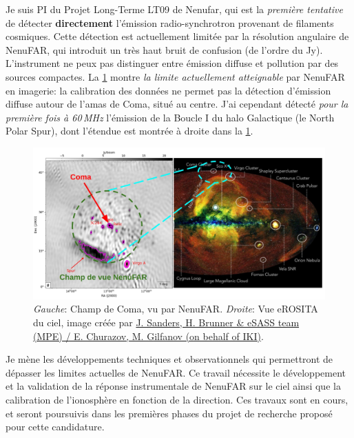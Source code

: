 \pg
Je suis PI du Projet Long-Terme LT09 de Nenufar, qui est la \textit{premi\`ere tentative} de d\'etecter \textbf{directement} l'\'emission radio-synchrotron provenant de filaments cosmiques. Cette d\'etection est actuellement limit\'ee par la r\'esolution angulaire de NenuFAR, qui introduit un tr\`es haut bruit de confusion (de l'ordre du Jy). L'instrument ne peux pas distinguer entre \'emission diffuse et pollution par des sources compactes. La \cref{fig.coma.nenufar} montre \textit{la limite actuellement atteignable} par NenuFAR en imagerie: la calibration des donn\'ees ne permet pas la d\'etection d'\'emission diffuse autour de l'amas de Coma, situ\'e au centre. J'ai cependant d\'etect\'e \textit{pour la premi\`ere fois \`a 60\,MHz} l'\'emission de la Boucle I du halo Galactique (le North Polar Spur), dont l'\'etendue est montr\'ee \`a droite dans la \cref{fig.coma.nenufar}. %
\begin{figure}[H]
	\includegraphics[width=0.96\linewidth]{ProjetRecherche/nenufar_coma.jpeg}
	\caption{\textit{Gauche}: Champ de Coma, vu par NenuFAR. \textit{Droite}: Vue eROSITA du ciel, image cr\'e\'ee par \href{https://skyandtelescope.org/astronomy-news/what-and-where-is-the-north-polar-spur/}{J. Sanders, H. Brunner \& eSASS team (MPE) / E. Churazov, M. Gilfanov (on behalf of IKI)}.} \label{fig.coma.nenufar}
\end{figure}


\pg
Je m\`ene les d\'eveloppements techniques et observationnels qui permettront de d\'epasser les limites actuelles de NenuFAR.
Ce travail n\'ecessite le d\'eveloppement et la validation de la r\'eponse instrumentale de NenuFAR sur le ciel ainsi que la calibration de l'ionosph\`ere en fonction de la direction. Ces travaux sont en cours, et seront poursuivis dans les premi\`eres phases du projet de recherche propos\'e pour cette candidature.%

